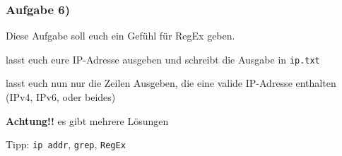 \documentclass[12pt,utf8]{beamer}
\begin{document}
\begin{frame}
\frametitle{Aufgabe 6)}
Diese Aufgabe soll euch ein Gefühl für RegEx geben.
\begin{itemize}
{\footnotesize
	\item lasst euch eure IP-Adresse ausgeben und schreibt die Ausgabe in \texttt{ip.txt}
	\item lasst euch nun nur die Zeilen Ausgeben, die eine valide IP-Adresse enthalten (IPv4, IPv6, oder beides)
	\item \textbf{Achtung!!} es gibt mehrere Lösungen
	}
\end{itemize}
{\scriptsize Tipp: \texttt{ip addr}, \texttt{grep}, \texttt{RegEx}}
\end{frame}
\end{document}
